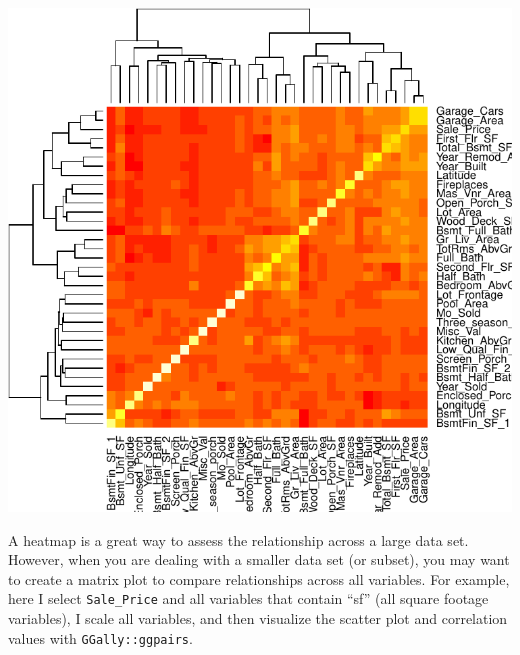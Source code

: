 \documentclass[]{article}
\newenvironment{Shaded}{\begin{snugshade}}{\end{snugshade}}
\newcommand{\KeywordTok}[1]{\textcolor[rgb]{0.13,0.29,0.53}{\textbf{#1}}}
\newcommand{\StringTok}[1]{\textcolor[rgb]{0.31,0.60,0.02}{#1}}
\newcommand{\OperatorTok}[1]{\textcolor[rgb]{0.81,0.36,0.00}{\textbf{#1}}}
\newcommand{\NormalTok}[1]{#1}
\begin{document}
\begin{Shaded}
\end{Shaded}

\begin{center}\includegraphics{Chapter_3_-_Visualization_files/figure-latex/heatmap-1} \end{center}

A heatmap is a great way to assess the relationship across a large data
set. However, when you are dealing with a smaller data set (or subset),
you may want to create a matrix plot to compare relationships across all
variables. For example, here I select \texttt{Sale\_Price} and all
variables that contain ``sf'' (all square footage variables), I scale
all variables, and then visualize the scatter plot and correlation
values with \texttt{GGally::ggpairs}.

\begin{Shaded}
\end{Shaded}
\end{document}
